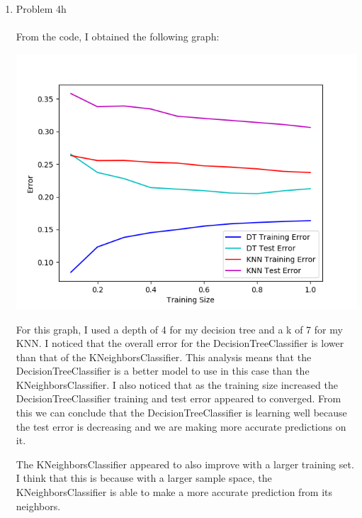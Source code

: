\documentclass[11pt]{article}
\newcommand{\solution}[1]{{{\color{blue}{\bf Solution:} {#1}}}}
\begin{document}
\begin{enumerate}
\item Problem 4h \\
\solution{} \\
From the code, I obtained the following graph: \\
\centerline{\includegraphics[scale=0.5]{Figure_3}}
For this graph, I used a depth of 4 for my decision tree and a k of 7 for my KNN. I noticed that the overall error for the DecisionTreeClassifier is lower than that of the KNeighborsClassifier. This analysis means that the DecisionTreeClassifier is a better model to use in this case than the KNeighborsClassifier. I also noticed that as the training size increased the DecisionTreeClassifier training and test error appeared to converged. From this we can conclude that the DecisionTreeClassifier is learning well because the test error is decreasing and we are making more accurate predictions on it.

The KNeighborsClassifier appeared to also improve with a larger training set. I think that this is because with a larger sample  space, the KNeighborsClassifier is able to make a more accurate prediction from its neighbors.
\end{enumerate}
\end{document}
